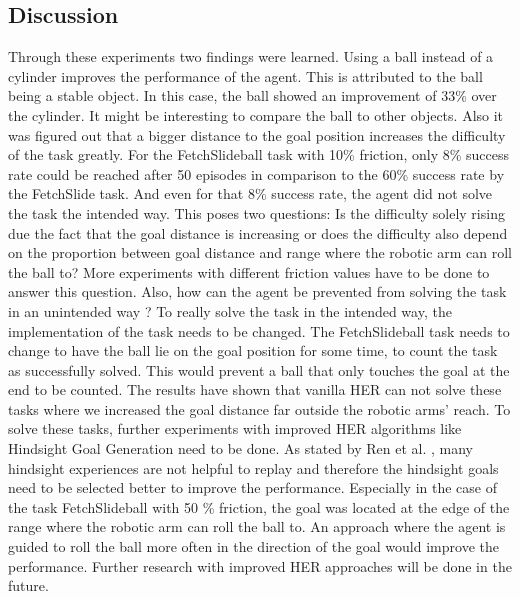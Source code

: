
\subsection{Discussion}

Through these experiments two findings were learned. Using a ball instead of a cylinder improves the performance of the agent. This is attributed to the ball being a stable object. In this case, the ball showed an improvement of 33\% over the cylinder. It might be interesting to compare the ball to other objects. 
\newline
Also it was figured out that a bigger distance to the goal position increases the difficulty of the task greatly. For the FetchSlideball task with 10\% friction, only 8\% success rate could be reached after 50 episodes in comparison to the 60\% success rate by the FetchSlide task. And even for that 8\% success rate, the agent did not solve the task the intended way. 
\newline
This poses two questions: Is the difficulty solely rising due the fact that the goal distance is increasing or does the difficulty also depend on the proportion between goal distance and range where the robotic arm can roll the ball to? More experiments with different friction values have to be done to answer this question.
\newline
Also, how can the agent be prevented from solving the task in an unintended way ? To really solve the task in the intended way, the implementation of the task needs to be changed. The FetchSlideball task needs to change to have the ball lie on the goal position for some time, to count the task as successfully solved. This would prevent a ball that only touches the goal at the end to be counted.
\newline
The results have shown that vanilla HER can not solve these tasks where we increased the goal distance far outside the robotic arms' reach. To solve these tasks, further experiments with improved HER algorithms like Hindsight Goal Generation need to be done. As stated by Ren et al. \cite{hgg}, many hindsight experiences are not helpful to replay and therefore the hindsight goals need to be selected better to improve the performance. Especially in the case of the task FetchSlideball with 50 \% friction, the goal was located at the edge of the range where the robotic arm can roll the ball to. An approach where the agent is guided to roll the ball more often in the direction of the goal would improve the performance. Further research with improved HER approaches will be done in the future.

